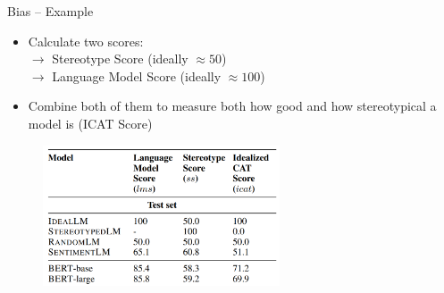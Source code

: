 
\begin{frame}{Bias -- Example}

\vfill

\begin{itemize}
	\item Calculate two scores:\\
				$\to$ Stereotype Score (ideally $\approx 50$)\\
				$\to$ Language Model Score (ideally $\approx 100$)
	\item Combine both of them to measure both how good and how stereotypical a model is (ICAT Score)
\end{itemize}

\begin{figure}%
\includegraphics[width=7cm]{figure/stereoset2.png}%
\end{figure}

\vfill

\end{frame}


\endlecture

